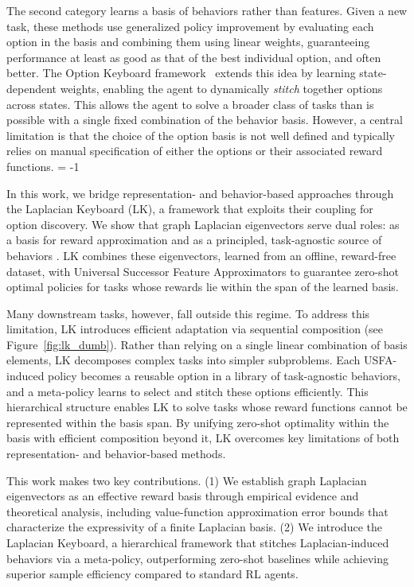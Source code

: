 \documentclass{article}
\theoremstyle{plain}
\theoremstyle{definition}
\theoremstyle{remark}
\begin{document}
The second category learns a basis of behaviors \citep[or options;][]{sutton1999between} rather than features. Given a new task, these methods use generalized policy improvement \citep[GPI;][]{barreto2017successor} by evaluating each option in the basis and combining them using linear weights, guaranteeing performance at least as good as that of the best individual option, and often better. The Option Keyboard framework~\citep{barreto2019option} extends this idea by learning state-dependent weights, enabling the agent to dynamically \textit{stitch} together options across states. This allows the agent to solve a broader class of tasks than is possible with a single fixed combination of the behavior basis. However, a central limitation is that the choice of the option basis is not well defined and typically relies on manual specification of either the options or their associated reward functions. \looseness = -1


In this work, we bridge representation- and behavior-based approaches through the Laplacian Keyboard (LK), a framework that exploits their coupling for option discovery. We show that graph Laplacian eigenvectors serve dual roles: as a basis for reward approximation and as a principled, task-agnostic source of behaviors \cite{machado2023temporal}. LK combines these eigenvectors, learned from an offline, reward-free dataset, with Universal Successor Feature Approximators \citep[USFA;][]{borsauniversal} to guarantee zero-shot optimal policies for tasks whose rewards lie within the span of the learned basis.


Many downstream tasks, however, fall outside this regime. To address this limitation, LK introduces efficient adaptation via sequential composition (see Figure~\ref{fig:lk_dumb}). Rather than relying on a single linear combination of basis elements, LK decomposes complex tasks into simpler subproblems. Each USFA-induced policy becomes a reusable option in a library of task-agnostic behaviors, and a meta-policy learns to select and stitch these options efficiently. This hierarchical structure enables LK to solve tasks whose reward functions cannot be represented within the basis span. By unifying zero-shot optimality within the basis with efficient composition beyond it, LK overcomes key limitations of both representation- and behavior-based methods.


This work makes two key contributions. (1) We establish graph Laplacian eigenvectors as an effective reward basis through empirical evidence and theoretical analysis, including value-function approximation error bounds that characterize the expressivity of a finite Laplacian basis. (2) We introduce the Laplacian Keyboard, a hierarchical framework that stitches Laplacian-induced behaviors via a meta-policy, outperforming zero-shot baselines while achieving superior sample efficiency compared to standard RL agents. 
\end{document}
